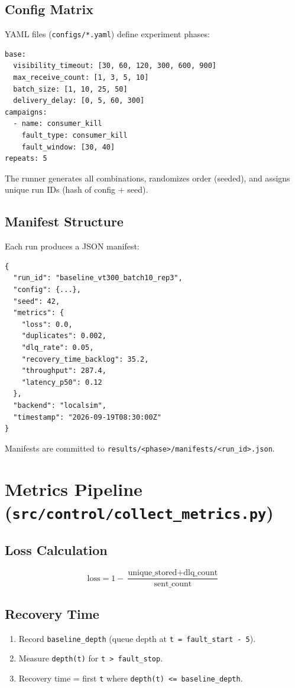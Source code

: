 \subsection{Config Matrix}

YAML files (\texttt{configs/*.yaml}) define experiment phases:
\begin{verbatim}
base:
  visibility_timeout: [30, 60, 120, 300, 600, 900]
  max_receive_count: [1, 3, 5, 10]
  batch_size: [1, 10, 25, 50]
  delivery_delay: [0, 5, 60, 300]
campaigns:
  - name: consumer_kill
    fault_type: consumer_kill
    fault_window: [30, 40]
repeats: 5
\end{verbatim}

The runner generates all combinations, randomizes order (seeded), and assigns unique run IDs (hash of config + seed).

\subsection{Manifest Structure}

Each run produces a JSON manifest:
\begin{verbatim}
{
  "run_id": "baseline_vt300_batch10_rep3",
  "config": {...},
  "seed": 42,
  "metrics": {
    "loss": 0.0,
    "duplicates": 0.002,
    "dlq_rate": 0.05,
    "recovery_time_backlog": 35.2,
    "throughput": 287.4,
    "latency_p50": 0.12
  },
  "backend": "localsim",
  "timestamp": "2026-09-19T08:30:00Z"
}
\end{verbatim}

Manifests are committed to \texttt{results/<phase>/manifests/<run\_id>.json}.

\section{Metrics Pipeline (\texttt{src/control/collect\_metrics.py})}

\subsection{Loss Calculation}

\[
\text{loss} = 1 - \frac{\text{unique\_stored} + \text{dlq\_count}}{\text{sent\_count}}
\]

\subsection{Recovery Time}

\begin{enumerate}
    \item Record \texttt{baseline\_depth} (queue depth at \texttt{t = fault\_start - 5}).
    \item Measure \texttt{depth(t)} for \texttt{t > fault\_stop}.
    \item Recovery time = first \texttt{t} where \texttt{depth(t) <= baseline\_depth}.
\end{enumerate}

